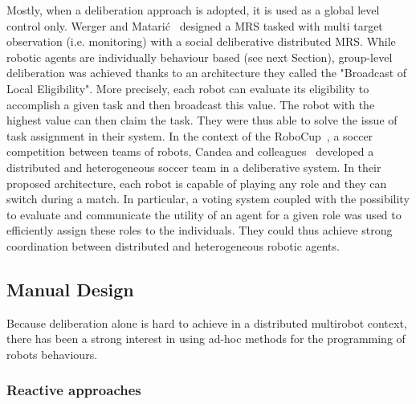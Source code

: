     Mostly, when a deliberation approach is adopted, it is used as a global level control only. Werger and Matarić~\parencite{Werger2000} designed a MRS tasked with multi target observation (i.e. monitoring) with a social deliberative distributed MRS. While robotic agents are individually behaviour based (see next Section), group-level deliberation was achieved thanks to an architecture they called the "Broadcast of Local Eligibility". More precisely, each robot can evaluate its eligibility to accomplish a given task and then broadcast this value. The robot with the highest value can then claim the task. They were thus able to solve the issue of task assignment in their system. In the context of the RoboCup~\parencite{Kitano1997}, a soccer competition between teams of robots, Candea and colleagues~\parencite{Candea2001} developed a distributed and heterogeneous soccer team in a deliberative system. In their proposed architecture, each robot is capable of playing any role and they can switch during a match. In particular, a voting system coupled with the possibility to evaluate and communicate the utility of an agent for a given role was used to efficiently assign these roles to the individuals. They could thus achieve strong coordination between distributed and heterogeneous robotic agents.


  \subsection{Manual Design}

    Because deliberation alone is hard to achieve in a distributed multirobot context, there has been a strong interest in using ad-hoc methods for the programming of robots behaviours.

    \subsubsection{Reactive approaches}


